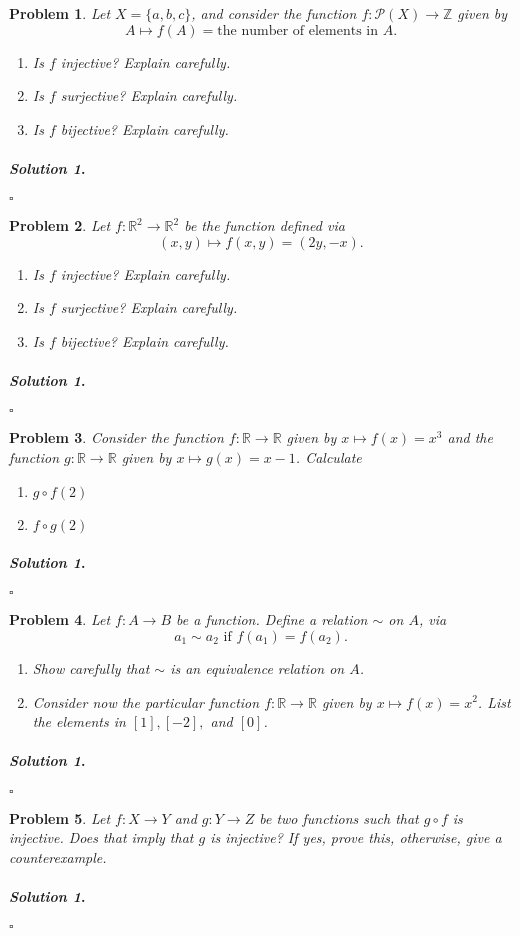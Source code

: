 \documentclass{amsart}
\theoremstyle{plain}
\newtheorem{problem}{Problem}
\newenvironment{solution}{\paragraph{\emph{Solution 1}.}}{\hfill$\square$}
\begin{document}
\begin{problem}
Let $X = \{ a,b,c\}$, and consider the function $f:\mathcal{P}(X) \rightarrow \mathbb{Z}$ given by
$$A \mapsto f(A) = \text{the number of elements in }A. $$
\begin{enumerate}
\item Is $f$ injective?  Explain carefully.
\item Is $f$ surjective?  Explain carefully.
\item Is $f$ bijective?  Explain carefully.
\end{enumerate}
\end{problem}
\begin{solution}
\end{solution}



\begin{problem}
Let $f:\mathbb{R}^{2} \rightarrow \mathbb{R}^{2}$ be the function defined via
$$(x,y) \mapsto f(x,y) = (2y,-x). $$
\begin{enumerate}
\item Is $f$ injective?  Explain carefully.
\item Is $f$ surjective?  Explain carefully.
\item Is $f$ bijective?  Explain carefully.
\end{enumerate}
\end{problem}
\begin{solution}
\end{solution}

\begin{problem}
Consider the function $f:\mathbb{R} \rightarrow \mathbb{R}$ given by $x \mapsto f(x) = x^{3}$ and the function $g:\mathbb{R} \rightarrow \mathbb{R}$ given by $x \mapsto g(x) = x-1$.  Calculate
\begin{enumerate}
\item $g \circ f (2)$
\item $f \circ g (2)$
\end{enumerate}
\end{problem}
\begin{solution}
\end{solution}

\begin{problem}
Let $f:A \rightarrow B$ be a function.  Define a relation $\sim$ on $A$, via
$$a_{1} \sim a_{2} \text{ if } f(a_{1}) = f(a_{2}). $$
\begin{enumerate}
\item Show carefully that $\sim$ is an equivalence relation on $A$.
\item Consider now the particular function $f:\mathbb{R} \rightarrow \mathbb{R}$ given by $x \mapsto f(x) = x^{2}$.  List the elements in $[1], [-2],$ and $[0]$.
\end{enumerate}
\end{problem}
\begin{solution}
\end{solution}

\begin{problem}
Let $f:X \rightarrow Y$ and $g:Y \rightarrow Z$ be two functions such that $g \circ f$ is injective.  Does that imply that $g$ is injective?  If yes, prove this, otherwise, give a counterexample.
\end{problem}
\begin{solution}
\end{solution}
\end{document}

